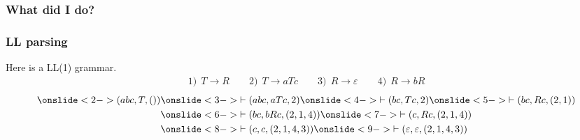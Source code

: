 \documentclass[t,24pt]{beamer}
\begin{document}
\begin{frame}[hvid]
    \frametitle{What did I do?}
\end{frame}

\begin{frame}
    \frametitle{LL parsing}
    Here is a LL(1) grammar.
    \begin{align*}
        1)\:\: T \to R \qquad 2)\:\: T \to aTc \qquad 3)\:\: R \to \varepsilon \qquad 4)\:\: R \to bR
    \end{align*}
    \begin{align*}
        \onslide<2->{(abc, T, ())} & \onslide<3->{\vdash (abc, aTc, 2)} \onslide<4->{\vdash (bc, Tc, 2)} \onslide<5->{\vdash (bc, Rc, (2, 1))} \\
                                   & \onslide<6->{\vdash (bc, bRc, (2, 1, 4))} \onslide<7->{\vdash (c, Rc, (2, 1, 4))}                         \\
                                   & \onslide<8->{\vdash (c, c, (2, 1, 4, 3))} \onslide<9->{\vdash (\varepsilon, \varepsilon, (2, 1, 4, 3))}
    \end{align*}
\end{frame}
\end{document}
